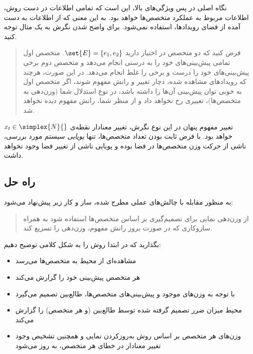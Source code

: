 \documentclass[a4paper,11px]{article}
\begin{document}
نگاه اصلی در پس ویژگی‌های بالا، این است که تمامی اطلاعات در دست روش، اطلاعات مربوط به عملکرد متخصص‌ها خواهد بود. به این معنی که از اطلاعات به دست آمده از فضای رویدادها، استفاده نمی‌شود. برای واضح شدن نگرش به یک مثال توجه کنید.
\begin{quote}
فرض کنید که دو متخصص در اختیار دارید 
$\set{E} = \{ e_1, e_2 \}$. 
متخصص اول تمامی پیش‌بینی‌های خود را به درستی انجام می‌دهد و متخصص دوم برخی پیش‌بینی‌های خود را درست و برخی را غلط انجام می‌دهد. در این صورت، هرچند که رویدادهای مشاهده شده، دچار تغییر و رانش مفهوم شوند، اگر متخصص اول به خوبی توان پیش‌بینی آن‌ها را داشته باشد، در نوع استدلال شما (وزن‌دهی به متخصص‌ها)، تغییری رخ نخواهد داد و از منظر شما، رانش مفهوم دیده نخواهد شد.
\end{quote}

تغییر مفهوم پنهان در این نوع نگرش، تغییر معنادار نقطه‌ی 
$x_t \in \simplex{N}{}$ 
خواهد بود. با فرض ثابت بودن تعداد متخصص‌ها، تنها 
\textit{
پویایی
} 
سیستم مورد بررسی، ناشی از حرکت وزن متخصص‌ها در فضا بوده و پویایی ناشی از تغییر فضا وجود نخواهد داشت.

\subsection{
راه حل
}
به منظور مقابله با چالش‌های عملی مطرح شده، ساز و کار زیر پیش‌نهاد می‌شود:
\begin{quote}
از وزن‌دهی نمایی برای تصمیم‌گیری بر اساس متخصص‌ها استفاده شود به همراه سازوکاری که در صورت بروز رانش مفهوم، وزن‌دهی را تسریع کند.
\end{quote}

بگذارید که در ابتدا روش را به شکل کلامی توضیح دهیم:
\begin{itemize}
\item 
مشاهده‌ای از محیط به متخصص‌ها می‌رسد
\item 
هر متخصص پیش‌بینی خود را گزارش می‌کند
\item 
با توجه به وزن‌های موجود و پیش‌بینی‌های متخصص‌ها، طالع‌بین تصمیم می‌گیرد
\item 
محیط میزان ضرر تصمیم گرفته شده توسط طالع‌بین (و هر متخصص) را گزارش می‌کند
\item 
وزن‌های هر متخصص بر اساس روش به‌روزکردن نمایی و همچنین تشخیص وجود تغییر معنادار در خطای هر متخصص، به روز می‌شود
\end{itemize}
\end{document}
